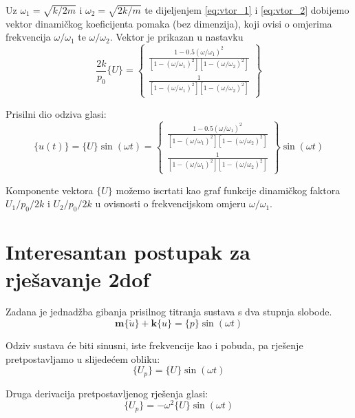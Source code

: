 \documentclass{rgn}
\newcommand\ffrac[2]{\frac{\displaystyle #1}{\displaystyle #2}}
\newcommand\mm{\mathbf{m}}
\newcommand\kk{\mathbf{k}}
\begin{document}
Uz $\omega_1=\sqrt{k/2m}$ i $\omega_2=\sqrt{2k/m}$ te dijeljenjem \eqref{eq:vtor_1} i \eqref{eq:vtor_2}
dobijemo vektor dinamičkog koeficijenta pomaka (bez dimenzija), koji ovisi o
omjerima frekvencija $\omega/\omega_1$ te $\omega/\omega_2$. Vektor je prikazan u nastavku
\begin{equation}
    \frac{2k}{p_0}\{U\}
    =
    \begin{Bmatrix}
        \ffrac{1-0.5(\omega/\omega_1)^2}
              {[1-(\omega/\omega_1)^2][1-(\omega/\omega_2)^2]}\\[12pt]
        \ffrac{1}
              {[1-(\omega/\omega_1)^2][1-(\omega/\omega_2)^2]}
    \end{Bmatrix}
\end{equation}

Prisilni dio odziva glasi:
\begin{equation}
    \{u(t)\} = \{U\}\sin(\omega t) = 
    \begin{Bmatrix}
        \ffrac{1-0.5(\omega/\omega_1)^2}
              {[1-(\omega/\omega_1)^2][1-(\omega/\omega_2)^2]}\\[12pt]
        \ffrac{1}
              {[1-(\omega/\omega_1)^2][1-(\omega/\omega_2)^2]}
    \end{Bmatrix}
    \sin(\omega t)
\end{equation}

Komponente vektora $\{U\}$ možemo iscrtati kao graf funkcije dinamičkog faktora
$U_1/p_0/2k$ i $U_2/p_0/2k$ u ovisnosti o frekvencijskom omjeru $\omega/\omega_1$.

\section{Interesantan postupak za rješavanje 2dof}
Zadana je jednadžba gibanja prisilnog titranja sustava s dva stupnja slobode.
\begin{equation}\label{eq:jdn_gibanja_osnovno}
    \mm\{\ddot{u}\}+\kk\{u\}=\{p\}\sin(\omega t)
\end{equation}

Odziv sustava će biti sinusni, iste frekvencije kao i pobuda, pa rješenje
pretpostavljamo u slijedećem obliku:
\begin{equation}\label{eq:pretpostavljeno}
    \{U_p\}=\{U\}\sin(\omega t)
\end{equation}

Druga derivacija pretpostavljenog rješenja glasi:
\begin{equation}\label{eq:pretpostavljeno_dd}
    \{U_p\}=-\omega^2\{U\}\sin(\omega t)
\end{equation}
\end{document}
